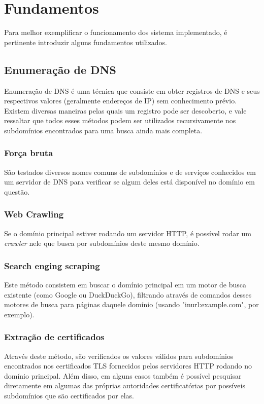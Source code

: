 \chapter{Fundamentos}
\label{cap:fundamentos}

Para melhor exemplificar o funcionamento dos sistema implementado, é pertinente introduzir alguns fundamentos utilizados. 

\section{Enumeração de DNS}

Enumeração de DNS é uma técnica que consiste em obter registros de DNS e seus respectivos valores (geralmente endereços de IP) sem conhecimento prévio. Existem diversas maneiras pelas quais um registro pode ser descoberto, e vale ressaltar que todos esses métodos podem ser utilizados recursivamente nos subdomínios encontrados para uma busca ainda mais completa.
        
        \subsection{Força bruta} São testados diversos nomes comuns  de subdomínios e de serviços conhecidos em um servidor de DNS para verificar se algum deles está disponível no domínio em questão.
        
        \subsection{Web Crawling} Se o domínio principal estiver rodando um servidor HTTP, é possível rodar um \textit{crawler} nele que busca por subdomínios deste mesmo domínio.
        
        \subsection{Search enging scraping} Este método consistem em buscar o domínio principal em um motor de busca existente (como Google ou DuckDuckGo), filtrando através de comandos desses motores de busca para páginas daquele domínio (usando "inurl:example.com", por exemplo).
        
        \subsection{Extração de certificados} Através deste método, são verificados os valores válidos para subdomínios encontrados nos certificados TLS fornecidos pelos servidores HTTP rodando no domínio principal. Além disso, em alguns casos também é possível pesquisar diretamente em algumas das próprias autoridades certificatórias por possíveis subdomínios que são certificados por elas.
        
